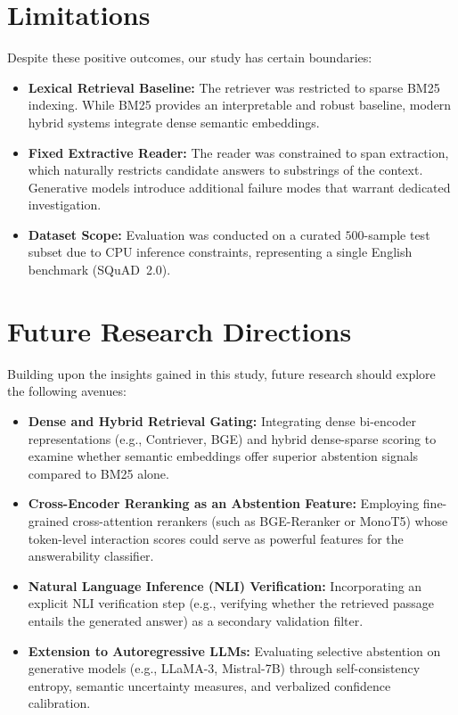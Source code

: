 \section{Limitations}
\label{sec:conclusion_limitations}

Despite these positive outcomes, our study has certain boundaries:
\begin{itemize}
  \item \textbf{Lexical Retrieval Baseline:} The retriever was restricted to sparse BM25 indexing. While BM25 provides an interpretable and robust baseline, modern hybrid systems integrate dense semantic embeddings.
  \item \textbf{Fixed Extractive Reader:} The reader was constrained to span extraction, which naturally restricts candidate answers to substrings of the context. Generative models introduce additional failure modes that warrant dedicated investigation.
  \item \textbf{Dataset Scope:} Evaluation was conducted on a curated $500$-sample test subset due to CPU inference constraints, representing a single English benchmark (SQuAD~2.0).
\end{itemize}

\section{Future Research Directions}
\label{sec:conclusion_future}

Building upon the insights gained in this study, future research should explore the following avenues:

\begin{itemize}
  \item \textbf{Dense and Hybrid Retrieval Gating:} Integrating dense bi-encoder representations (e.g., Contriever, BGE) and hybrid dense-sparse scoring to examine whether semantic embeddings offer superior abstention signals compared to BM25 alone.
  
  \item \textbf{Cross-Encoder Reranking as an Abstention Feature:} Employing fine-grained cross-attention rerankers (such as BGE-Reranker or MonoT5) whose token-level interaction scores could serve as powerful features for the answerability classifier.
  
  \item \textbf{Natural Language Inference (NLI) Verification:} Incorporating an explicit NLI verification step (e.g., verifying whether the retrieved passage entails the generated answer) as a secondary validation filter.
  
  \item \textbf{Extension to Autoregressive LLMs:} Evaluating selective abstention on generative models (e.g., LLaMA-3, Mistral-7B) through self-consistency entropy, semantic uncertainty measures, and verbalized confidence calibration.
\end{itemize}
